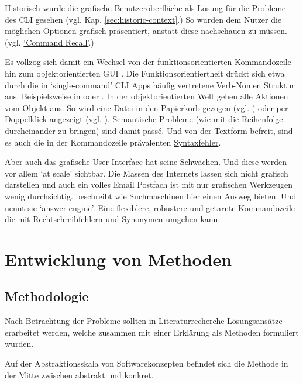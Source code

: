 \documentclass[oneside,bibliography=totocnumbered,BCOR=5mm]{scrbook}
\begin{document}
Historisch wurde die grafische Benutzeroberfläche als Lösung für die Probleme
des CLI gesehen (vgl. Kap. \ref{sec:historic-context}.) So wurden dem Nutzer die
möglichen Optionen grafisch präsentiert, anstatt diese nachschauen zu müssen.
(vgl. \hyperref[prob:cr]{`Command Recall'}.)

Es vollzog sich damit ein Wechsel von der funktionsorientierten
Kommandozeile hin zum objektorientierten GUI \parencite{nielson1993}. Die
Funktionsorientiertheit drückt sich etwa durch die in `single-command' CLI Apps
häufig vertretene Verb-Nomen Struktur aus. Beispielsweise in  oder . In der objektorientierten Welt gehen alle
Aktionen vom Objekt aus. So wird eine Datei in den Papierkorb gezogen (vgl.
) oder per Doppelklick angezeigt (vgl. ). Semantische Probleme (wie mit  die Reihenfolge
durcheinander zu bringen) sind damit passé. Und von der Textform befreit, sind
es auch die in der Kommandozeile prävalenten \hyperref[prob:ss]{Syntaxfehler}.

Aber auch das grafische User Interface hat seine Schwächen. Und diese werden vor
allem `at scale' sichtbar. Die Massen des Internets lassen sich nicht grafisch
darstellen und auch ein volles Email Postfach ist mit nur grafischen Werkzeugen
wenig durchsichtig. \textcite{Norman_2007} beschreibt wie Suchmaschinen hier einen
Ausweg bieten. Und nennt sie `answer engine'. Eine flexiblere, robustere und
getarnte Kommandozeile die mit Rechtschreibfehlern und Synonymen umgehen kann.

\chapter{Entwicklung von Methoden}
\label{sec:methods}

\section{Methodologie}

Nach Betrachtung der \hyperref[sec:cli-problems]{Probleme} sollten in
Literaturrecherche Lösungsansätze erarbeitet werden, welche zusammen mit einer
Erklärung als Methoden formuliert wurden.

Auf der Abstraktionsskala von Softwarekonzepten befindet sich die Methode in der
Mitte zwischen abstrakt und konkret.
\end{document}
